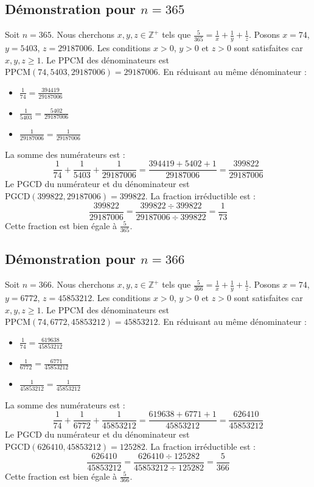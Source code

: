 \documentclass[11pt,a4paper]{article}
\begin{document}
\subsection{Démonstration pour $n = 365$}
Soit $n = 365$. Nous cherchons $x, y, z \in \mathbb{Z}^{+}$ tels que $\frac{5}{365} = \frac{1}{x} + \frac{1}{y} + \frac{1}{z}$.
Posons $x = 74$, $y = 5403$, $z = 29187006$.
Les conditions $x > 0$, $y > 0$ et $z > 0$ sont satisfaites car $x, y, z \geq 1$.
Le PPCM des dénominateurs est $\text{PPCM}(74, 5403, 29187006) = 29187006$.
En réduisant au même dénominateur :
\begin{itemize}
    \item $\frac{1}{74} = \frac{394419}{29187006}$
    \item $\frac{1}{5403} = \frac{5402}{29187006}$
    \item $\frac{1}{29187006} = \frac{1}{29187006}$
\end{itemize}
La somme des numérateurs est :
$$ \frac{1}{74} + \frac{1}{5403} + \frac{1}{29187006} = \frac{394419 + 5402 + 1}{29187006} = \frac{399822}{29187006} $$
Le PGCD du numérateur et du dénominateur est $\text{PGCD}(399822, 29187006) = 399822$.
La fraction irréductible est :
$$ \frac{399822}{29187006} = \frac{399822 \div 399822}{29187006 \div 399822} = \frac{1}{73} $$
Cette fraction est bien égale à $\frac{5}{365}$.

\subsection{Démonstration pour $n = 366$}
Soit $n = 366$. Nous cherchons $x, y, z \in \mathbb{Z}^{+}$ tels que $\frac{5}{366} = \frac{1}{x} + \frac{1}{y} + \frac{1}{z}$.
Posons $x = 74$, $y = 6772$, $z = 45853212$.
Les conditions $x > 0$, $y > 0$ et $z > 0$ sont satisfaites car $x, y, z \geq 1$.
Le PPCM des dénominateurs est $\text{PPCM}(74, 6772, 45853212) = 45853212$.
En réduisant au même dénominateur :
\begin{itemize}
    \item $\frac{1}{74} = \frac{619638}{45853212}$
    \item $\frac{1}{6772} = \frac{6771}{45853212}$
    \item $\frac{1}{45853212} = \frac{1}{45853212}$
\end{itemize}
La somme des numérateurs est :
$$ \frac{1}{74} + \frac{1}{6772} + \frac{1}{45853212} = \frac{619638 + 6771 + 1}{45853212} = \frac{626410}{45853212} $$
Le PGCD du numérateur et du dénominateur est $\text{PGCD}(626410, 45853212) = 125282$.
La fraction irréductible est :
$$ \frac{626410}{45853212} = \frac{626410 \div 125282}{45853212 \div 125282} = \frac{5}{366} $$
Cette fraction est bien égale à $\frac{5}{366}$.
\end{document}

